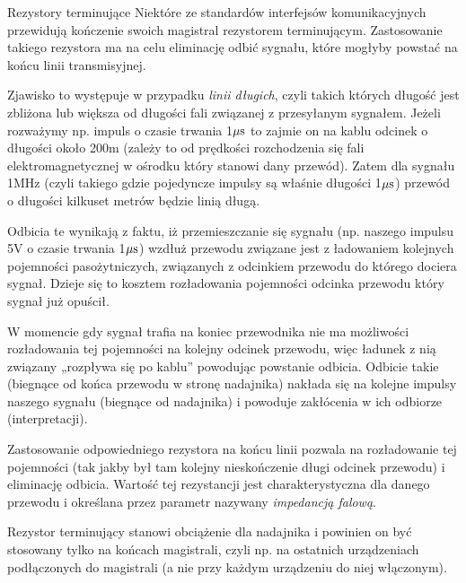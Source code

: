 \begin{ProTip}[breakable]{Rezystory terminujące }
Niektóre  ze standardów interfejsów komunikacyjnych przewidują kończenie swoich magistral rezystorem terminującym.
Zastosowanie takiego rezystora ma na celu eliminację odbić sygnału, które mogłyby powstać na końcu linii transmisyjnej.

\vspace{7pt}

Zjawisko to występuje w przypadku \textit{linii długich}, czyli takich których długość jest zbliżona lub większa od długości fali związanej z przesyłanym sygnałem.
Jeżeli rozważymy np. impuls o czasie trwania 1$\mu \rm s$ to zajmie on na kablu odcinek o długości około 200m (zależy to od prędkości rozchodzenia się fali elektromagnetycznej w ośrodku który stanowi dany przewód).
Zatem dla sygnału 1MHz (czyli takiego gdzie pojedyncze impulsy są właśnie długości 1$\mu \rm s$) przewód o długości kilkuset metrów będzie linią długą.

\vspace{7pt}

Odbicia te wynikają z faktu, iż przemieszczanie się sygnału (np. naszego impulsu 5V o czasie trwania 1$\mu \rm s$) wzdłuż przewodu związane jest z
	ładowaniem kolejnych pojemności pasożytniczych, związanych z odcinkiem przewodu do którego dociera sygnał.
Dzieje się to kosztem rozładowania pojemności odcinka przewodu który sygnał już opuścił.

W momencie gdy sygnał trafia na koniec przewodnika nie ma możliwości rozładowania tej pojemności na kolejny odcinek przewodu, więc ładunek z nią związany „rozpływa się po kablu” powodując powstanie odbicia.
Odbicie takie (biegnące od końca przewodu w stronę nadajnika) nakłada się na kolejne impulsy naszego sygnału (biegnące od nadajnika) i powoduje zakłócenia w ich odbiorze (interpretacji).

Zastosowanie odpowiedniego rezystora na końcu linii pozwala na rozładowanie tej pojemności (tak jakby był tam kolejny nieskończenie długi odcinek przewodu) i eliminację odbicia.
Wartość tej rezystancji jest charakterystyczna dla danego przewodu i określana przez parametr nazywany \textit{impedancją falową}.

Rezystor terminujący stanowi obciążenie dla nadajnika i powinien on być stosowany tylko na końcach magistrali, czyli np. na ostatnich urządzeniach podłączonych do magistrali (a nie przy każdym urządzeniu do niej włączonym).

\vspace{7pt}


\end{ProTip}
